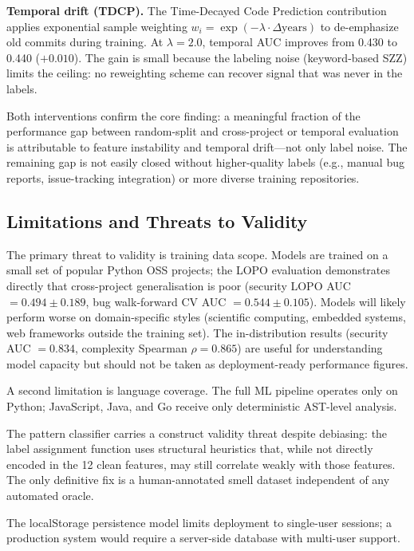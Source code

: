 \documentclass[12pt, oneside]{report}
\begin{document}
\textbf{Temporal drift (TDCP).} The Time-Decayed Code Prediction contribution applies
exponential sample weighting $w_i = \exp(-\lambda \cdot \Delta\text{years})$ to
de-emphasize old commits during training. At $\lambda = 2.0$, temporal AUC improves
from 0.430 to 0.440 ($+0.010$). The gain is small because the labeling noise
(keyword-based SZZ) limits the ceiling: no reweighting scheme can recover signal
that was never in the labels.

Both interventions confirm the core finding: a meaningful fraction of the performance
gap between random-split and cross-project or temporal evaluation is attributable to
feature instability and temporal drift---not only label noise. The remaining gap
is not easily closed without higher-quality labels (e.g., manual bug reports,
issue-tracking integration) or more diverse training repositories.

\subsection{Limitations and Threats to Validity}

The primary threat to validity is training data scope. Models are trained on a small
set of popular Python OSS projects; the LOPO evaluation demonstrates directly that
cross-project generalisation is poor (security LOPO AUC $= 0.494 \pm 0.189$,
bug walk-forward CV AUC $= 0.544 \pm 0.105$). Models will likely perform worse
on domain-specific styles (scientific computing, embedded systems, web frameworks
outside the training set). The in-distribution results (security AUC $= 0.834$,
complexity Spearman $\rho = 0.865$) are useful for understanding model capacity
but should not be taken as deployment-ready performance figures.

A second limitation is language coverage. The full ML pipeline operates only on
Python; JavaScript, Java, and Go receive only deterministic AST-level analysis.

The pattern classifier carries a construct validity threat despite debiasing: the
label assignment function uses structural heuristics that, while not directly encoded
in the 12 clean features, may still correlate weakly with those features. The only
definitive fix is a human-annotated smell dataset independent of any automated oracle.

The localStorage persistence model limits deployment to single-user sessions; a
production system would require a server-side database with multi-user support.
\end{document}

